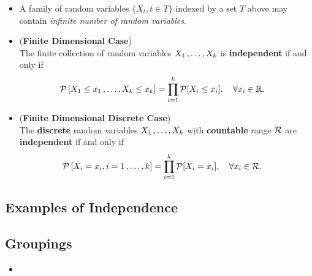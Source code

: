 \documentclass[11pt]{article}
\begin{document}
\begin{itemize}
\item \begin{remark}
A family of random variables $\{X_t, t \in T\}$ indexed by a set $T$ above may contain \emph{infinite number of random variables}.
\end{remark}

\item \begin{corollary} (\textbf{Finite Dimensional Case}) \citep{resnick2013probability} \\
The finite collection of random variables $X_1 \,{,}\ldots{,}\, X_k$ is \textbf{independent} if and only if
\begin{align*}
{\mathcal P}\left[X_1 \le x_1 \,{,}\ldots{,}\, X_k \le x_k\right] &= \prod_{i =1}^{k}{\mathcal P}[X_i \le x_i], \quad \forall x_i \in {\mathbb R}.
\end{align*}
\end{corollary}

\item \begin{corollary}  (\textbf{Finite Dimensional Discrete Case}) \citep{resnick2013probability} \\
The \textbf{discrete} random variables $X_1 \,{,}\ldots{,}\, X_k$ with \textbf{countable} range ${\mathcal R}$ are \textbf{independent} if and only if
\begin{align*}
{\mathcal P}\left[X_i = x_i, i=1 \,{,}\ldots{,}\, k\right] &= \prod_{i =1}^{k}{\mathcal P}[X_i = x_i], \quad \forall x_i \in {\mathcal R}.
\end{align*}
\end{corollary}
\end{itemize}
\subsection{Examples of Independence}

\subsection{Groupings}
\begin{itemize}
\item 
\end{itemize}
\end{document}
